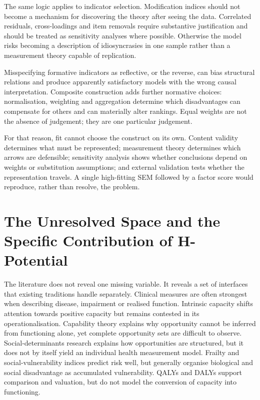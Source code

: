 The same logic applies to indicator selection. Modification indices should not become a mechanism for discovering the theory after seeing the data. Correlated residuals, cross-loadings and item removals require substantive justification and should be treated as sensitivity analyses where possible. Otherwise the model risks becoming a description of idiosyncrasies in one sample rather than a measurement theory capable of replication.

Misspecifying formative indicators as reflective, or the reverse, can bias
structural relations and produce apparently satisfactory models with the wrong
causal interpretation. \cite{jarvis_2003} Composite construction adds further
normative choices: normalisation, weighting and aggregation determine which
disadvantages can compensate for others and can materially alter rankings.
Equal weights are not the absence of judgement; they are one particular
judgement. \cite{greco_2019}

For that reason, fit cannot choose the construct on its own. Content validity
determines what must be represented; measurement theory determines which arrows
are defensible; sensitivity analysis shows whether conclusions depend on
weights or substitution assumptions; and external validation tests whether the
representation travels. A single high-fitting SEM followed by a factor score
would reproduce, rather than resolve, the problem.

\section{The Unresolved Space and the Specific Contribution of H-Potential}

The literature does not reveal one missing variable. It reveals a set of
interfaces that existing traditions handle separately. Clinical measures are
often strongest when describing disease, impairment or realised function.
Intrinsic capacity shifts attention towards positive capacity but remains
contested in its operationalisation. Capability theory explains why opportunity
cannot be inferred from functioning alone, yet complete opportunity sets are
difficult to observe. Social-determinants research explains how opportunities
are structured, but it does not by itself yield an individual health
measurement model. Frailty and social-vulnerability indices predict risk well,
but generally organise biological and social disadvantage as accumulated
vulnerability. QALYs and DALYs support comparison and valuation, but do not
model the conversion of capacity into functioning.

